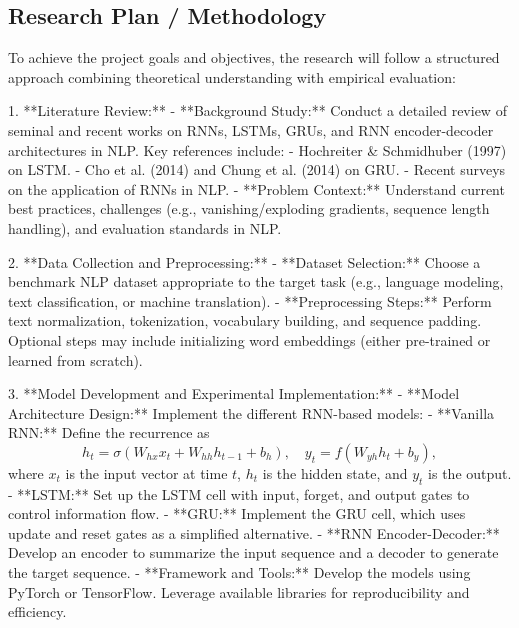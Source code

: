 \documentclass[12pt,a4paper]{article}
\begin{document}
\newpage

\subsection{Research Plan / Methodology}


To achieve the project goals and objectives, the research will follow a structured approach combining theoretical understanding with empirical evaluation:

1. **Literature Review:**
   - **Background Study:**  
     Conduct a detailed review of seminal and recent works on RNNs, LSTMs, GRUs, and RNN encoder-decoder architectures in NLP. Key references include:
     - Hochreiter \& Schmidhuber (1997) on LSTM.
     - Cho et al. (2014) and Chung et al. (2014) on GRU.
     - Recent surveys on the application of RNNs in NLP.
   - **Problem Context:**  
     Understand current best practices, challenges (e.g., vanishing/exploding gradients, sequence length handling), and evaluation standards in NLP.

2. **Data Collection and Preprocessing:**
   - **Dataset Selection:**  
     Choose a benchmark NLP dataset appropriate to the target task (e.g., language modeling, text classification, or machine translation).
   - **Preprocessing Steps:**  
     Perform text normalization, tokenization, vocabulary building, and sequence padding. Optional steps may include initializing word embeddings (either pre-trained or learned from scratch).

3. **Model Development and Experimental Implementation:**
   - **Model Architecture Design:**  
     Implement the different RNN-based models:
     - **Vanilla RNN:**  
       Define the recurrence as  
       \[
       h_t = \sigma(W_{hx} x_t + W_{hh} h_{t-1} + b_h), \quad y_t = f(W_{yh} h_t + b_y),
       \]
       where \(x_t\) is the input vector at time \(t\), \(h_t\) is the hidden state, and \(y_t\) is the output.
     - **LSTM:**  
       Set up the LSTM cell with input, forget, and output gates to control information flow.
     - **GRU:**  
       Implement the GRU cell, which uses update and reset gates as a simplified alternative.
     - **RNN Encoder-Decoder:**  
       Develop an encoder to summarize the input sequence and a decoder to generate the target sequence.
   - **Framework and Tools:**  
     Develop the models using PyTorch or TensorFlow. Leverage available libraries for reproducibility and efficiency.
\end{document}
